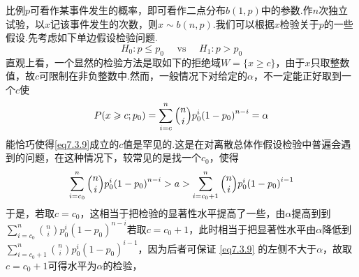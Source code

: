 比例$p$可看作某事件发生的概率，即可看作二点分布$b(1,p)$中的参数.作$n$次独立试验，以$x$记该事件发生的次数，则$x\sim b(n,p)$.我们可以根据$x$检验关于$p$的一些假设.先考虑如下单边假设检验问题.
\begin{equation}\label{eq7.3.8}
H _ { 0 } : p \leq p _ { 0 } \quad \text { vs } \quad H _ { 1 } : p > p _ { 0 }
\end{equation}
直观上看，一个显然的检验方法是取如下的拒绝域$W=\{x\geq c\}$，由于$x$只取整数值，故$c$可限制在非负整数中.然而，一般情况下对给定的$\alpha$，不一定能正好取到一个$c$使
	\begin{equation}\label{eq7.3.9}
	P \left( x \geq c ; p _ { 0 } \right) = \sum _ { i = c } ^ { n } \Binom ni p _ { 0 } ^ { i } \left( 1 - p _ { 0 } \right) ^ { n - i } = \alpha
	\end{equation}
能恰巧使得\ref{eq7.3.9}成立的$c$值是罕见的.这是在对离散总体作假设检验中普遍会遇到的问题，在这种情况下，较常见的是找一个$c_{0}$，使得
\[\sum_{i=c_0}^n\Binom ni p_{0}^{i}\left(1-p_0\right)^{n-i}>a>\sum_{i=c_0+1}^n
\Binom nip_{0}^{i}\left(1-p_0\right)^{i-1}\]
于是，若取$c=c_{0}$，这相当于把检验的显著性水平提高了一些，由$\alpha$提高到到$\sum_{i=c_0}^n\binom nip_{0}^{i}\left(1-p_0\right)^{n-i}$若取$c=c_{0}+1$，此时相当于把显著性水平由$\alpha$降低到$\sum_{i=c_0+1}^n\binom nip_{0}^{i}\left(1-p_0\right)^{i-1}$，因为后者可保证 \eqref{eq7.3.9} 的左侧不大于$\alpha$，故取$c=c_{0}+1$可得水平为$\alpha$的检验，

